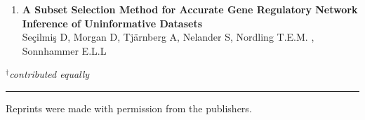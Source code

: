 \begin{enumerate}[P{A}PER I: ]
\item\textbf{A Subset Selection Method for Accurate Gene Regulatory Network Inference of Uninformative Datasets}\\
Seçilmiş D, Morgan D, Tj{\"a}rnberg A, Nelander S, Nordling T.E.M. , Sonnhammer E.L.L





\end{enumerate}
\noindent \emph{$^{\dagger}$contributed equally}

\noindent
\rule{\linewidth}{0.5mm}

\vspace{2mm}

\noindent
Reprints were made with permission from the publishers.\\
\noindent \\



